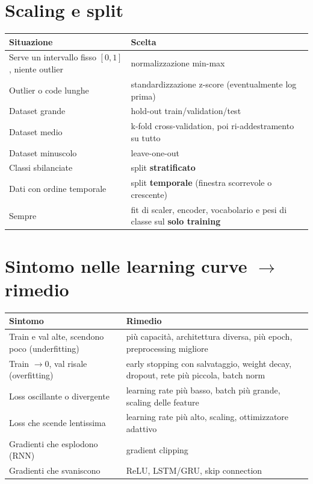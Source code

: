 \section{Scaling e split}
\begin{center}
\small
\begin{tabularx}{\textwidth}{>{\raggedright\arraybackslash}p{3.6cm} >{\raggedright\arraybackslash}X}
\toprule
\textbf{Situazione} & \textbf{Scelta}\\
\midrule
Serve un intervallo fisso $[0,1]$, niente outlier & normalizzazione min-max\\
Outlier o code lunghe & standardizzazione z-score (eventualmente log prima)\\
Dataset grande & hold-out train/validation/test\\
Dataset medio & k-fold cross-validation, poi ri-addestramento su tutto\\
Dataset minuscolo & leave-one-out\\
Classi sbilanciate & split \textbf{stratificato}\\
Dati con ordine temporale & split \textbf{temporale} (finestra scorrevole o crescente)\\
Sempre & fit di scaler, encoder, vocabolario e pesi di classe sul \textbf{solo training}\\
\bottomrule
\end{tabularx}
\end{center}

\section{Sintomo nelle learning curve $\rightarrow$ rimedio}
\begin{center}
\small
\begin{tabularx}{\textwidth}{>{\raggedright\arraybackslash}p{4.4cm} >{\raggedright\arraybackslash}X}
\toprule
\textbf{Sintomo} & \textbf{Rimedio}\\
\midrule
Train e val alte, scendono poco (underfitting) & più capacità, architettura diversa, più epoch, preprocessing migliore\\
Train $\to 0$, val risale (overfitting) & early stopping con salvataggio, weight decay, dropout, rete più piccola, batch norm\\
Loss oscillante o divergente & learning rate più basso, batch più grande, scaling delle feature\\
Loss che scende lentissima & learning rate più alto, scaling, ottimizzatore adattivo\\
Gradienti che esplodono (RNN) & gradient clipping\\
Gradienti che svaniscono & ReLU, LSTM/GRU, skip connection\\
\bottomrule
\end{tabularx}
\end{center}

